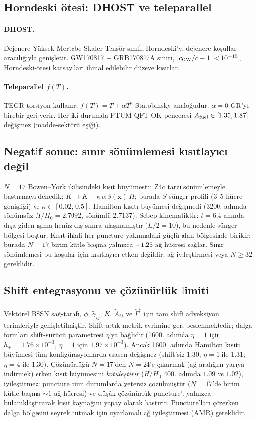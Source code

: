 \subsection{Horndeski ötesi: DHOST ve teleparallel}
\paragraph{DHOST.}
Dejenere Yüksek-Mertebe Skaler-Tensör sınıfı, Horndeski'yi
dejenere koşullar aracılığıyla genişletir. GW170817 + GRB170817A
sınırı, $|c_{\rm GW}/c - 1| < 10^{-15}$, Horndeski-ötesi
katsayıları ihmal edilebilir düzeye kısıtlar.
\paragraph{Teleparallel $f(T)$.}
TEGR torsiyon kullanır; $f(T) = T + \alpha T^2$ Starobinsky
analoğudur. $\alpha = 0$ GR'yi birebir geri verir.
Her iki durumda PTUM QFT-OK penceresi $A_{\rm fuel} \in [1.35,
1.87]$ değişmez (madde-sektörü eşiği).

\subsection{Negatif sonuc: sınır sönümlemesi kısıtlayıcı değil}

$N=17$ Bowen--York ikilisindeki kısıt büyümesini Z4c tarzı sönümlemeyle bastırmayı denedik: $\dot K \to \dot K - \kappa\,\alpha\,S(\mathbf{x})\,H$; burada $S$ sünger profili (3--5 hücre genişliği) ve $\kappa \in [0.02,\,0.5]$. Hamilton kısıtı büyümesi değişmedi (3200. adımda sönümsüz $H/H_0 = 2.7092$, sönümlü $2.7137$). Sebep kinematiktir: $t = 6.4$ anında dışa giden ışıma henüz dış sınıra ulaşmamıştır ($L/2 = 10$), bu nedenle sünger bölgesi boştur. Kısıt ihlali her puncture yakınındaki güçlü-alan bölgesinde birikir; burada $N=17$ birim kütle başına yalnızca $\sim 1.25$ ağ hücresi sağlar. Sınır sönümlemesi bu koşular için kısıtlayıcı etken değildir; ağ iyileştirmesi veya $N \ge 32$ gereklidir.

\subsection{Shift entegrasyonu ve çözünürlük limiti}

Vektörel BSSN sağ-tarafı, $\phi$, $\tilde\gamma_{ij}$, $K$, $\tilde A_{ij}$ ve $\tilde\Gamma^i$ için tam shift adveksiyon terimleriyle genişletilmiştir. Shift artık metrik evrimine geri beslenmektedir; dalga formları shift-sürücü parametresi $\eta$'ya bağlıdır (1600. adımda $\eta=1$ için $h_+ = 1.76 \times 10^{-3}$, $\eta=4$ için $1.97\times 10^{-3}$). Ancak 1600. adımda Hamilton kısıtı büyümesi tüm konfigürasyonlarda esasen değişmez (shift'siz 1.30; $\eta=1$ ile 1.31; $\eta=4$ ile 1.30). Çözünürlüğü $N=17$'den $N=24$'e çıkarmak (ağ aralığını yarıya indirmek) erken kısıt büyümesini \emph{kötüleştirir} ($H/H_0$ 400. adımda $1.09$ vs $1.02$), iyileştirmez: puncture tüm durumlarda yetersiz çözülmüştür ($N=17$'de birim kütle başına $\sim 1$ ağ hücresi) ve düşük çözünürlük puncture'ı yalnızca bulanıklaştırarak kısıt kaynağını yapay olarak bastırır. Puncture'ları çözerken dalga bölgesini seyrek tutmak için uyarlamalı ağ iyileştirmesi (AMR) gereklidir.

